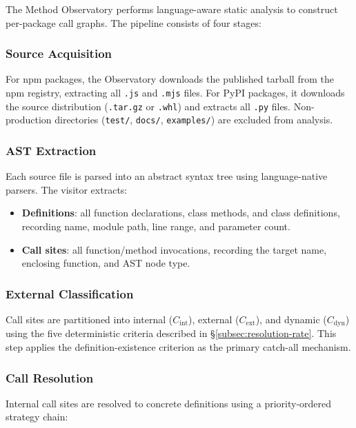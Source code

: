\documentclass[conference]{IEEEtran}
\begin{document}
The Method Observatory performs language-aware static analysis to construct per-package call graphs. The pipeline consists of four stages:

\subsubsection{Source Acquisition}

For npm packages, the Observatory downloads the published tarball from the npm registry, extracting all \texttt{.js} and \texttt{.mjs} files. For PyPI packages, it downloads the source distribution (\texttt{.tar.gz} or \texttt{.whl}) and extracts all \texttt{.py} files. Non-production directories (\texttt{test/}, \texttt{docs/}, \texttt{examples/}) are excluded from analysis.

\subsubsection{AST Extraction}

Each source file is parsed into an abstract syntax tree using language-native parsers. The visitor extracts:
\begin{itemize}
    \item \textbf{Definitions}: all function declarations, class methods, and class definitions, recording name, module path, line range, and parameter count.
    \item \textbf{Call sites}: all function/method invocations, recording the target name, enclosing function, and AST node type.
\end{itemize}

\subsubsection{External Classification}

Call sites are partitioned into internal ($C_{\mathrm{int}}$), external ($C_{\mathrm{ext}}$), and dynamic ($C_{\mathrm{dyn}}$) using the five deterministic criteria described in §\ref{subsec:resolution-rate}. This step applies the definition-existence criterion as the primary catch-all mechanism.

\subsubsection{Call Resolution}

Internal call sites are resolved to concrete definitions using a priority-ordered strategy chain:
\end{document}
